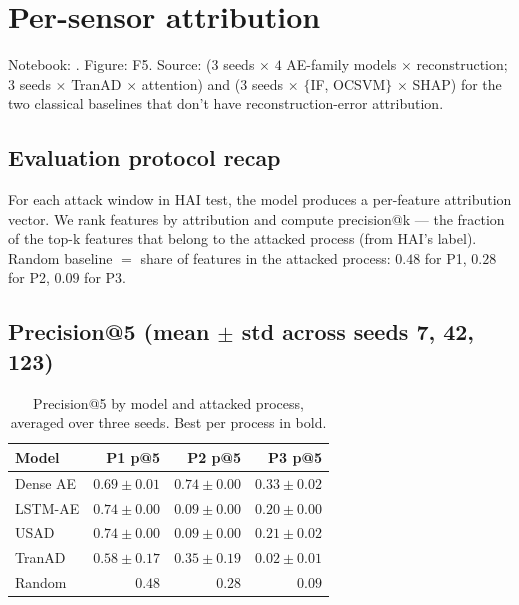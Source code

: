 \section{Per-sensor attribution}
\label{ch:results-attribution}

Notebook: .  Figure: F5.  Source:  ($3$ seeds $\times$ $4$ AE-family models $\times$ reconstruction; $3$ seeds $\times$ TranAD $\times$ attention) and  ($3$ seeds $\times$ $\{$IF, OCSVM$\}$ $\times$ SHAP) for the two classical baselines that don't have reconstruction-error attribution.

\subsection{Evaluation protocol recap}

For each attack window in HAI test, the model produces a per-feature attribution vector.  We rank features by attribution and compute precision@k --- the fraction of the top-k features that belong to the attacked process (from HAI's  label).  Random baseline $=$ share of features in the attacked process: $0.48$ for P1, $0.28$ for P2, $0.09$ for P3.

\subsection{Precision@5 (mean $\pm$ std across seeds 7, 42, 123)}

\begin{table}[h]
\centering
\caption{Precision@5 by model and attacked process, averaged over three seeds.  Best per process in bold.}
\label{tab:attr-p5}
\small
\begin{tabular}{lrrr}
\toprule
Model & P1 p@5 & P2 p@5 & P3 p@5 \\
\midrule
Dense AE & $0.69 \pm 0.01$ & $0.74 \pm 0.00$ & $\mathbf{0.33 \pm 0.02}$ \\
LSTM-AE  & $0.74 \pm 0.00$ & $0.09 \pm 0.00$ & $0.20 \pm 0.00$ \\
USAD     & $0.74 \pm 0.00$ & $0.09 \pm 0.00$ & $0.21 \pm 0.02$ \\
TranAD   & $0.58 \pm 0.17$ & $\mathbf{0.35 \pm 0.19}$ & $0.02 \pm 0.01$ \\
Random   & $0.48$ & $0.28$ & $0.09$ \\
\bottomrule
\end{tabular}
\end{table}


